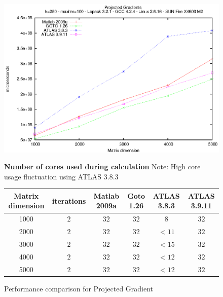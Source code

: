 \documentclass[a4paper,10pt]{scrartcl}
\begin{document}
	\begin{figure}
		\label{Figure5}	
		\includegraphics{nmf_pg.eps}\newline

		
		\textbf{Number of cores used during calculation}\newline
		Note: High core usage fluctuation using ATLAS 3.8.3\newline

		\begin{tabular}{|c|c|c|c|c|c|}
			\hline
			Matrix dimension & iterations & Matlab 2009a & Goto 1.26 & ATLAS 3.8.3 & ATLAS 3.9.11\\
			\hline
			1000 & $2$ & $32$ & $32$ & $8$ & $32$\\
			2000 & $2$ & $32$ & $32$ & $<11$ & $32$ \\
			3000 & $2$ & $32$ & $32$ & $<15$ & $32$\\
			4000 & $2$ & $32$ & $32$ & $<12$ & $32$\\
			5000 & $2$ & $32$ & $32$ & $<12$ & $32$\\
			\hline
		\end{tabular}
		\caption{Performance comparison for Projected Gradient}
	\end{figure}
	
\end{document}
